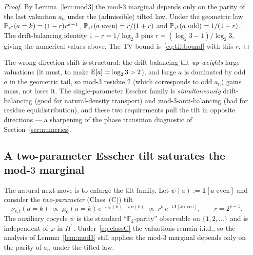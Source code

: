 \documentclass[11pt]{amsart}
\theoremstyle{definition}
\theoremstyle{remark}
\begin{document}
\begin{proof}
By Lemma~\ref{lem:mod3} the mod-$3$ marginal depends only on the parity of the last valuation $a_n$
under the (admissible) tilted law. Under the geometric law $\mathbb{P}_{s^\dagger}(a=k)=(1-r)r^{k-1}$,
$\mathbb{P}_{s^\dagger}(a\text{ even})=r/(1+r)$ and $\mathbb{P}_{s^\dagger}(a\text{ odd})=1/(1+r)$. The drift-balancing
identity $1-r=1/\log_2 3$ pins $r=(\log_2 3-1)/\log_2 3$, giving the numerical values above.
The TV bound is~\eqref{eq:tiltbound} with this $r$.
\end{proof}

The wrong-direction shift is structural: the drift-balancing tilt \emph{up-weights} large valuations
(it must, to make $\mathbb{E}[a]=\log_2 3>2$), and large $a$ is dominated by odd $a$ in the geometric tail, so
mod-$3$ residue $2$ (which corresponds to odd $a_n$) gains mass, not loses it. The single-parameter
Esscher family is \emph{simultaneously} drift-balancing (good for natural-density transport) and
mod-$3$-anti-balancing (bad for residue equidistribution), and these two requirements pull the tilt in
opposite directions --- a sharpening of the phase transition diagnostic of Section~\ref{sec:numerics}.

\subsection{A two-parameter Esscher tilt saturates the mod-$3$ marginal}

The natural next move is to enlarge the tilt family. Let $\psi(a):=\mathbf{1}[a\text{ even}]$ and
consider the \emph{two-parameter} (Class~(C)) tilt
\begin{equation}
  \nu_{s,t}(a=k)\;\propto\;\mu_0(a=k)\,e^{-s\,\varphi(k)-t\,\psi(k)}
  \;\propto\;r^k\,e^{-t\,\mathbf{1}[k\text{ even}]},
  \qquad r=2^{s-1}.
  \label{eq:classC}
\end{equation}
The auxiliary cocycle $\psi$ is the standard ``$\mathbb F_2$-parity'' observable on $\{1,2,\dots\}$ and
is independent of $\varphi$ in $H^1$. Under~\eqref{eq:classC} the valuations remain i.i.d., so the
analysis of Lemma~\ref{lem:mod3} still applies: the mod-$3$ marginal depends only on the parity of
$a_n$ under the tilted law.
\end{document}

